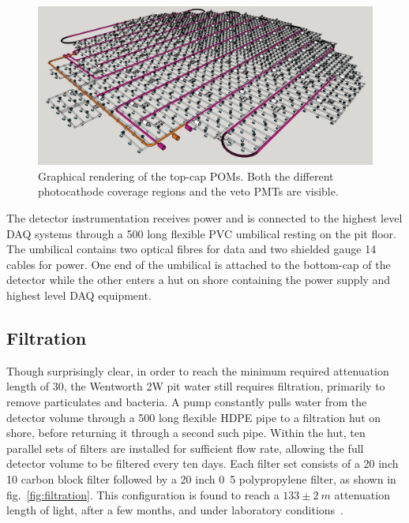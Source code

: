 \begin{figure} %
    \includegraphics[width=\textwidth]{diagrams/4-chips/top_cap.png}
    \caption[Graphical rendering of the top-cap POMs.]
    {Graphical rendering of the top-cap POMs. Both the different photocathode coverage regions and
        the veto PMTs are visible.}
    \label{fig:top_cap}
\end{figure}

The detector instrumentation receives power and is connected to the highest level DAQ systems
through a \unit{500}{} long flexible PVC umbilical resting on the pit floor. The
umbilical contains two optical fibres for data and two shielded gauge 14 cables for power. One end
of the umbilical is attached to the bottom-cap of the detector while the other enters a hut on
shore containing the power supply and highest level DAQ equipment.

\subsection{Filtration} %
\label{sec:chips_detector_water} %

Though surprisingly clear, in order to reach the minimum required attenuation length of
\unit{30}{}, the Wentworth 2W pit water still requires filtration, primarily to remove
particulates and bacteria. A pump constantly pulls water from the detector volume through a
\unit{500}{} long flexible HDPE pipe to a filtration hut on shore, before returning it
through a second such pipe. Within the hut, ten parallel sets of filters are installed for
sufficient flow rate, allowing the full detector volume to be filtered every ten days. Each filter
set consists of a 20 inch \unit{10}{\mu{}} carbon block filter followed by a 20 inch
\unit{0.5}{\mu{}} polypropylene filter, as shown in fig.~\ref{fig:filtration}. This
configuration is found to reach a $133\pm2~m$ attenuation length of light, after a few months, and
under laboratory conditions~\cite{campbell2020}.

